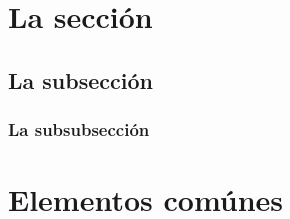 
\lipsum[1]

\section{La sección}
\lipsum[1]

\subsection{La subsección}
\lipsum[1]

\subsubsection{La subsubsección}
\lipsum[1]

\justifying
\section*{Elementos comúnes}

